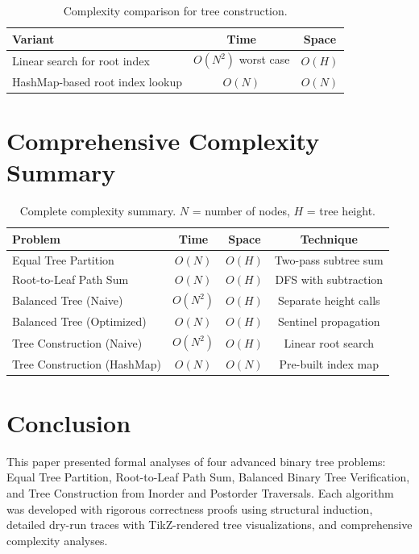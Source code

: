 \documentclass[10pt,journal,compsoc,onecolumn]{IEEEtran}
\begin{document}
\begin{table}[htbp]
\centering
\begin{tabular}{|l|c|c|}
\hline
\textbf{Variant} & \textbf{Time} & \textbf{Space} \\
\hline
Linear search for root index & $O(N^2)$ worst case & $O(H)$ \\
HashMap-based root index lookup & $O(N)$ & $O(N)$ \\
\hline
\end{tabular}
\caption{Complexity comparison for tree construction.}
\end{table}

\section{Comprehensive Complexity Summary}
\label{sec:summary}

\begin{table}[htbp]
\centering
\begin{tabular}{|l|c|c|c|}
\hline
\textbf{Problem} & \textbf{Time} & \textbf{Space} & \textbf{Technique} \\
\hline
Equal Tree Partition & $O(N)$ & $O(H)$ & Two-pass subtree sum \\
Root-to-Leaf Path Sum & $O(N)$ & $O(H)$ & DFS with subtraction \\
Balanced Tree (Naive) & $O(N^2)$ & $O(H)$ & Separate height calls \\
Balanced Tree (Optimized) & $O(N)$ & $O(H)$ & Sentinel propagation \\
Tree Construction (Naive) & $O(N^2)$ & $O(H)$ & Linear root search \\
Tree Construction (HashMap) & $O(N)$ & $O(N)$ & Pre-built index map \\
\hline
\end{tabular}
\caption{Complete complexity summary. $N$ = number of nodes, $H$ = tree height.}
\end{table}

\section{Conclusion}

This paper presented formal analyses of four advanced binary tree problems: Equal Tree Partition, Root-to-Leaf Path Sum, Balanced Binary Tree Verification, and Tree Construction from Inorder and Postorder Traversals. Each algorithm was developed with rigorous correctness proofs using structural induction, detailed dry-run traces with TikZ-rendered tree visualizations, and comprehensive complexity analyses.
\end{document}

